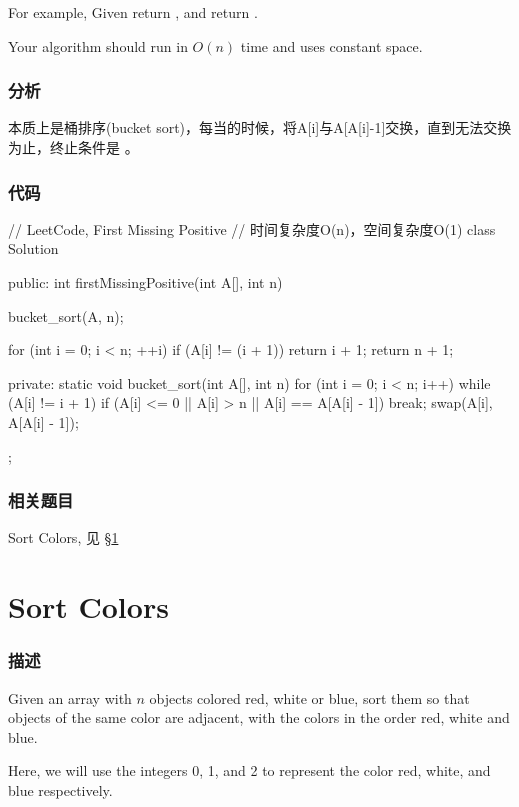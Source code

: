 For example,
Given \fn{[1,2,0]} return ,
and \fn{[3,4,-1,1]} return .

Your algorithm should run in $O(n)$ time and uses constant space.


\subsubsection{分析}
本质上是桶排序(bucket sort)，每当的时候，将A[i]与A[A[i]-1]交换，直到无法交换为止，终止条件是 。


\subsubsection{代码}
\begin{Code}
// LeetCode, First Missing Positive
// 时间复杂度O(n)，空间复杂度O(1)
class Solution {
public:
    int firstMissingPositive(int A[], int n) {
        bucket_sort(A, n);
        
        for (int i = 0; i < n; ++i)
            if (A[i] != (i + 1))
                return i + 1;
        return n + 1;
    }
private:
    static void bucket_sort(int A[], int n) {
        for (int i = 0; i < n; i++) {
            while (A[i] != i + 1) {
                if (A[i] <= 0 || A[i] > n || A[i] == A[A[i] - 1])
                    break;
                swap(A[i], A[A[i] - 1]);
            }
        }
    }
};
\end{Code}


\subsubsection{相关题目}
\begindot
\item Sort Colors, 见 \S \ref{sec:sort-colors}
\myenddot


\section{Sort Colors} %
\label{sec:sort-colors}


\subsubsection{描述}
Given an array with $n$ objects colored red, white or blue, sort them so that objects of the same color are adjacent, with the colors in the order red, white and blue.

Here, we will use the integers 0, 1, and 2 to represent the color red, white, and blue respectively.

